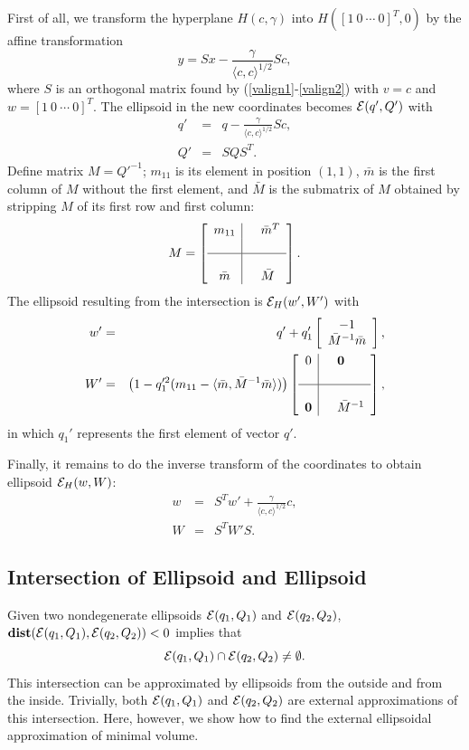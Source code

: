 \documentclass{report}
\newcommand{\EE}{{\cal E}}
\begin{document}
First of all, we transform the hyperplane $H(c,\gamma)$
into $H([1~0~\cdots~0]^T, 0)$ by the affine transformation
\[ y = Sx - \frac{\gamma}{\langle c,c\rangle^{1/2}}Sc, \]
where $S$ is an orthogonal matrix found by (\ref{valign1}-\ref{valign2}) with
$v=c$ and $w=[1~0~\cdots~0]^T$.
The ellipsoid in the new coordinates becomes $\EE(q',Q')$ with
\begin{eqnarray*}
q' & = & q-\frac{\gamma}{\langle c,c\rangle^{1/2}}Sc, \\
Q' & = & SQS^T.
\end{eqnarray*}
Define matrix $M=Q'^{-1}$; $m_{11}$ is its element in position $(1,1)$,
$\bar{m}$ is the first column of  $M$ without the first element,
and $\bar{M}$ is the submatrix of $M$ obtained by stripping $M$ of its
first row and first column:
\[ M = \left[\begin{array}{c|cl}
m_{11} & & \bar{m}^T\\
 & \\
\hline
 & \\
\bar{m} & & \bar{M}\end{array}\right]. \]
The ellipsoid resulting from the intersection is $\EE_H(w',W')$ with
\begin{eqnarray*}
w' & = & q' + q_1'\left[\begin{array}{c}
-1\\
\bar{M}^{-1}\bar{m}\end{array}\right],\\
W' & = & \left(1-q_1'^2(m_{11}-
\langle\bar{m},\bar{M}^{-1}\bar{m}\rangle)\right)\left[\begin{array}{c|cl}
0 & & {\bf 0}\\
 & \\
\hline
 & \\
{\bf 0} & & \bar{M}^{-1}\end{array}\right],
\end{eqnarray*}
in which $q_1'$ represents the first element of vector $q'$.

Finally, it remains to do the inverse transform of the coordinates
to obtain ellipsoid $\EE_H(w,W)$:
\begin{eqnarray*}
w & = & S^Tw' + \frac{\gamma}{\langle c,c\rangle^{1/2}}c, \\
W & = & S^TW'S.
\end{eqnarray*}


\subsection{Intersection of Ellipsoid and Ellipsoid}
Given two nondegenerate ellipsoids $\EE(q_1,Q_1)$ and $\EE(q_2,Q_2)$,
${\bf dist}(\EE(q_1,Q_1),\EE(q_2,Q_2))<0$ implies that
\[ \EE(q_1,Q_1)\cap\EE(q_2,Q_2)\neq\emptyset .\]
This intersection can be approximated by ellipsoids from the outside and
from the inside.
Trivially, both  $\EE(q_1,Q_1)$ and $\EE(q_2,Q_2)$ are external approximations
of this intersection.
Here, however, we show how to find the external ellipsoidal approximation
of minimal volume.
\end{document}
